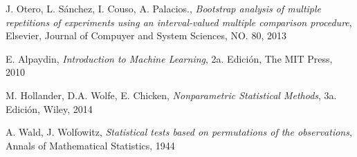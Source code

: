 \begin{thebibliography}{99}
	J. Otero, L. Sánchez, I. Couso, A. Palacios.,
	\emph{Bootstrap analysis of multiple repetitions of experiments using an interval-valued multiple comparison procedure},
	Elsevier, Journal of Compuyer and System Sciences,
	NO. 80,
	2013

	E. Alpaydin,
	\emph{Introduction to Machine Learning},
	2a. Edición, 
	The MIT Press,
	2010

	M. Hollander, D.A. Wolfe, E. Chicken,
	\emph{Nonparametric Statistical Methods},
	3a. Edición,
	Wiley,
	2014

	A. Wald, J. Wolfowitz,
	\emph{Statistical tests based on permutations of the observations},
	Annals of Mathematical Statistics,
	1944

	
\end{thebibliography}